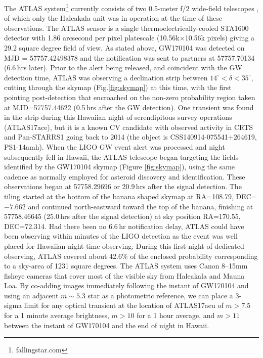 \documentclass[twocolumn]{aastex61}
\begin{document}
The ATLAS system\footnote{fallingstar.com} currently consists of two 0.5-meter f/2 wide-field telescopes \citep{2011PASP..123...58T}, 
of which only the Haleakala unit was in operation at the time of these observations. 
The ATLAS sensor is a single thermoelectrically-cooled STA1600 detector with 1.86 arcsecond per pixel platescale 
(10.56k$\times$10.56k pixels)
giving a 29.2 square degree field of view. 
As stated above, GW170104 was detected on MJD = 57757.42498378 
\citep{gw170104}
and the notification was sent to partners at 57757.70134 (6.6\,hrs later).  Prior to the alert being released, and 
coincident with the GW detection time, 
 ATLAS was observing a declination strip between 
$14^{\circ} < \delta < 35^{\circ}$, cutting through the skymap (Fig.\ref{fig:skymap}) at this time, with the  
first pointing post-detection that encroached on the non-zero probability region taken at MJD=57757.44622 (0.5\,hrs after the GW detection).  One transient was found in the strip during this Hawaiian night of serendipitous survey operations (ATLAS17ace), but it is a known CV candidate with observed activity in CRTS and Pan-STARRS1 going back to 2014 (the object is CSS140914-075541+264619, PS1-14amh).  When the LIGO GW event alert was processed and night subsequently fell in Hawaii, the ATLAS telescope began targeting the fields identified by the GW170104 skymap (Figure \ref{fig:skymap}), using the same cadence as normally employed for asteroid discovery and identification.  
These observations began at  
57758.29696 
or  20.9\,hrs after the signal detection.
The tiling started at the bottom of the banana shaped skymap at 
RA=108.79, DEC=$-7.662$ and continued north-eastward toward the top of the banana, finishing at 57758.46645 
(25.0\,hrs after the signal detection)
at sky position RA=170.55, DEC=72.314. 
Had there been no 6.6\,hr notification delay, 
ATLAS could have been observing within minutes of the LIGO detection as the event was well placed for Hawaiian night time observing. 
During this first night of dedicated observing, ATLAS covered about 42.6\% of the enclosed probability corresponding to a sky-area of 1231 square degrees.
The ATLAS system uses Canon 8--15mm fisheye cameras that cover most of
the visible sky from Haleakala and Mauna Loa.  By co-adding images
immediately following the instant of GW170104 and using an adjacent
$m\sim5.3$ star as a photometric reference, we can place a 3-sigma
limit for any optical transient at the location of ATLAS17aeu of $m>7.5$
for a 1 minute average brightness, $m>10$ for a 1 hour average, and
$m>11$ between the instant of GW170104 and the end of night in Hawaii.
\end{document}
